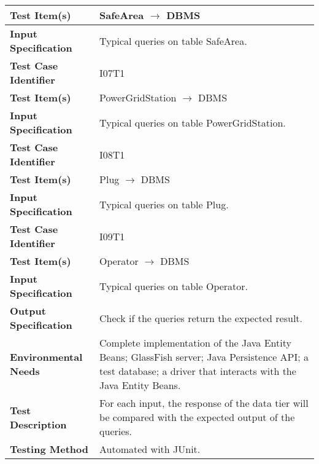 \begin{tabular}{l p{}}
    \hline
    \textbf{Test Item(s)} & SafeArea $\rightarrow$ DBMS \\
    \hline
    \textbf{Input Specification} & Typical queries on table SafeArea. \\
    \hline
    \hline
    \textbf{Test Case Identifier} & I07T1\\
    \hline
    \textbf{Test Item(s)} & PowerGridStation $\rightarrow$ DBMS \\
    \hline
    \textbf{Input Specification} & Typical queries on table PowerGridStation. \\
    \hline
    \hline
    \textbf{Test Case Identifier} & I08T1\\
    \hline
    \textbf{Test Item(s)} & Plug $\rightarrow$ DBMS \\
    \hline
    \textbf{Input Specification} & Typical queries on table Plug. \\
    \hline
    \hline
    \textbf{Test Case Identifier} & I09T1\\
    \hline
    \textbf{Test Item(s)} & Operator $\rightarrow$ DBMS \\
    \hline
    \textbf{Input Specification} & Typical queries on table Operator. \\
    \hline
    \hline
    \textbf{Output Specification} & Check if the queries return the expected result. \\
    \hline
    \textbf{Environmental Needs} & Complete implementation of the Java Entity Beans; GlassFish server; Java Persistence API; a test database; a driver that interacts with the Java Entity Beans.\\
    \hline
    \textbf{Test Description} & For each input, the response of the data tier will be compared with the expected output of the queries.\\
    \hline
    \textbf{Testing Method} & Automated with JUnit. \\
    \hline
\end{tabular}